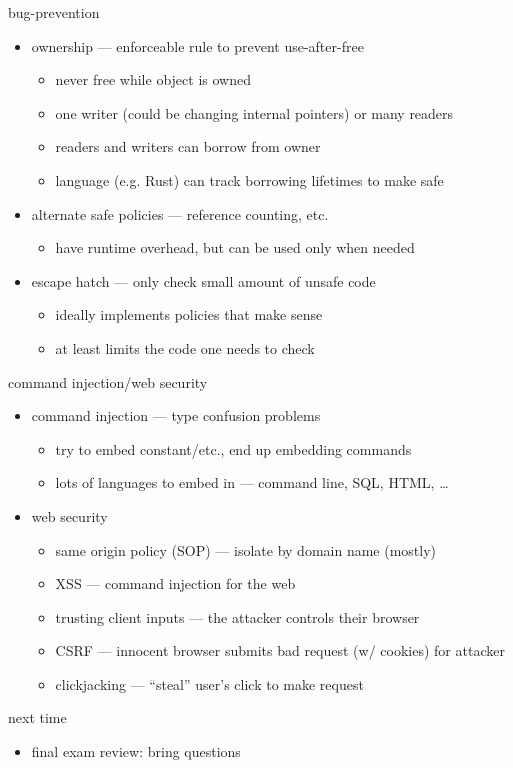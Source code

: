 \begin{frame}{bug-prevention}
    \begin{itemize}
        \item ownership --- enforceable rule to prevent use-after-free
            \begin{itemize}
            \item never free while object is owned
            \item one writer (could be changing internal pointers) or many readers
            \item readers and writers can borrow from owner
            \item language (e.g. Rust) can track borrowing lifetimes to make safe
            \end{itemize}
        \item alternate safe policies --- reference counting, etc.
            \begin{itemize}
            \item have runtime overhead, but can be used only when needed
            \end{itemize}
        \item escape hatch --- only check small amount of unsafe code
            \begin{itemize}
            \item ideally implements policies that make sense
            \item at least limits the code one needs to check
            \end{itemize}
    \end{itemize}
\end{frame}

\begin{frame}{command injection/web security}
    \begin{itemize}
        \item command injection --- type confusion problems
            \begin{itemize}
            \item try to embed constant/etc., end up embedding commands
            \item lots of languages to embed in --- command line, SQL, HTML, \ldots
            \end{itemize}
        \item web security
            \begin{itemize}
                \item same origin policy (SOP) --- isolate by domain name (mostly)
            \item XSS --- command injection for the web
            \item trusting client inputs --- the attacker controls their browser
            \item CSRF --- innocent browser submits bad request (w/ cookies) for attacker
            \item clickjacking --- ``steal'' user's click to make request
            \end{itemize}
    \end{itemize}
\end{frame}


\begin{frame}{next time}
    \begin{itemize}
    \item final exam review: bring questions
    \end{itemize}
\end{frame}


